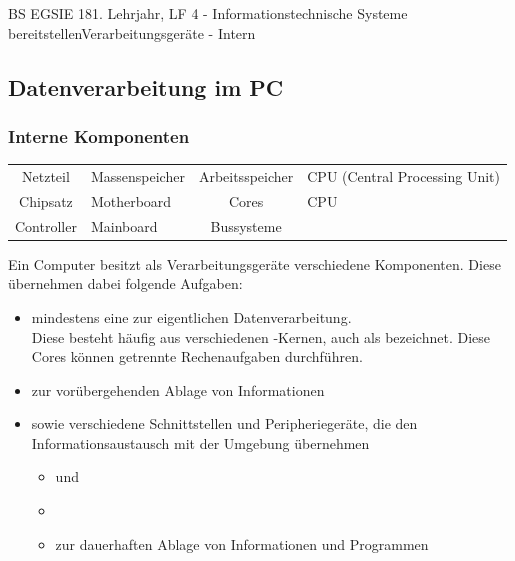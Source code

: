 \documentclass[oneside,openany,headings=optiontotoc,11pt,numbers=noenddot]{article}
\begin{document}
	\begin{worksheet}{BS EGSIE 18}{1. Lehrjahr, LF 4 - Informationstechnische Systeme bereitstellen}{Verarbeitungsgeräte - Intern}
		\onehalfspacing
		\clearpage
		\setcounter{page}{3}
		\setcounter{section}{1}
		\setcounter{subsection}{1}
		\subsection{Datenverarbeitung im PC}
		\subsubsection*{Interne Komponenten}
		\begin{framed}
			\renewcommand{\arraystretch}{1.25}
			\begin{tabularx}{\textwidth}{cMcM}
				Netzteil & Massenspeicher & Arbeitsspeicher & CPU (Central Processing Unit)\\
				Chipsatz & Motherboard & Cores & CPU\\
				Controller & Mainboard & Bussysteme
			\end{tabularx}
		\end{framed}
		Ein Computer besitzt als Verarbeitungsgeräte verschiedene Komponenten. Diese übernehmen dabei folgende Aufgaben:
		\begin{itemize}
			\item mindestens eine \underline{\color{white}{CPU (Central Processing Unit)CPU (Central Processing Unit)}} zur eigentlichen Datenverarbeitung.\\
			Diese besteht häufig aus verschiedenen \underline{\color{white}{CPUCPUCPU}}-Kernen, auch als \underline{\color{white}{CoresCoresCores}} bezeichnet. Diese Cores können getrennte Rechenaufgaben durchführen.
			\item \underline{\color{white}{ArbeitsspeicherArbeitsspeicherArbeitsspeicher}} zur vorübergehenden Ablage von Informationen
			\item sowie verschiedene Schnittstellen und Peripheriegeräte, die den Informationsaustausch mit der Umgebung übernehmen
			\begin{itemize}
				\item \underline{\color{white}{ChipsatzChipsatzChipsatz}} und \underline{\color{white}{ControllerControllerController}}
				\item \underline{\color{white}{BussystemeBussystemeBussysteme}}
				\item \underline{\color{white}{MassenspeicherMassenspeicherMassenspeicher}} zur dauerhaften Ablage von Informationen und Programmen

\end{itemize}
\end{itemize}
\end{worksheet}
\end{document}

